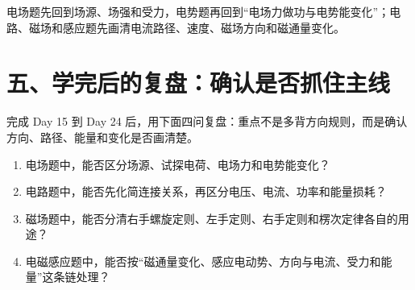 电场题先回到场源、场强和受力，电势题再回到“电场力做功与电势能变化”；电路、磁场和感应题先画清电流路径、速度、磁场方向和磁通量变化。

\section*{五、学完后的复盘：确认是否抓住主线}

完成 Day 15 到 Day 24 后，用下面四问复盘：重点不是多背方向规则，而是确认方向、路径、能量和变化是否画清楚。
\begin{enumerate}[itemsep=0.2em]
  \item 电场题中，能否区分场源、试探电荷、电场力和电势能变化？
  \item 电路题中，能否先化简连接关系，再区分电压、电流、功率和能量损耗？
  \item 磁场题中，能否分清右手螺旋定则、左手定则、右手定则和楞次定律各自的用途？
  \item 电磁感应题中，能否按“磁通量变化、感应电动势、方向与电流、受力和能量”这条链处理？
\end{enumerate}
